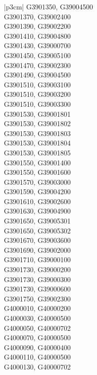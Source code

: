 \begin{customLongTable}{ |p{3cm}| }
G3901350, G39004500 \\ \hline
G3901370, G39002400 \\ \hline
G3901390, G39002200 \\ \hline
G3901410, G39004800 \\ \hline
G3901430, G39000700 \\ \hline
G3901450, G39005100 \\ \hline
G3901470, G39002300 \\ \hline
G3901490, G39004500 \\ \hline
G3901510, G39003100 \\ \hline
G3901510, G39003200 \\ \hline
G3901510, G39003300 \\ \hline
G3901530, G39001801 \\ \hline
G3901530, G39001802 \\ \hline
G3901530, G39001803 \\ \hline
G3901530, G39001804 \\ \hline
G3901530, G39001805 \\ \hline
G3901550, G39001400 \\ \hline
G3901550, G39001600 \\ \hline
G3901570, G39003000 \\ \hline
G3901590, G39004200 \\ \hline
G3901610, G39002600 \\ \hline
G3901630, G39004900 \\ \hline
G3901650, G39005301 \\ \hline
G3901650, G39005302 \\ \hline
G3901670, G39003600 \\ \hline
G3901690, G39002000 \\ \hline
G3901710, G39000100 \\ \hline
G3901730, G39000200 \\ \hline
G3901730, G39000300 \\ \hline
G3901730, G39000600 \\ \hline
G3901750, G39002300 \\ \hline
G4000010, G40000200 \\ \hline
G4000030, G40000500 \\ \hline
G4000050, G40000702 \\ \hline
G4000070, G40000500 \\ \hline
G4000090, G40000400 \\ \hline
G4000110, G40000500 \\ \hline
G4000130, G40000702 \\ \hline

\end{customLongTable}

